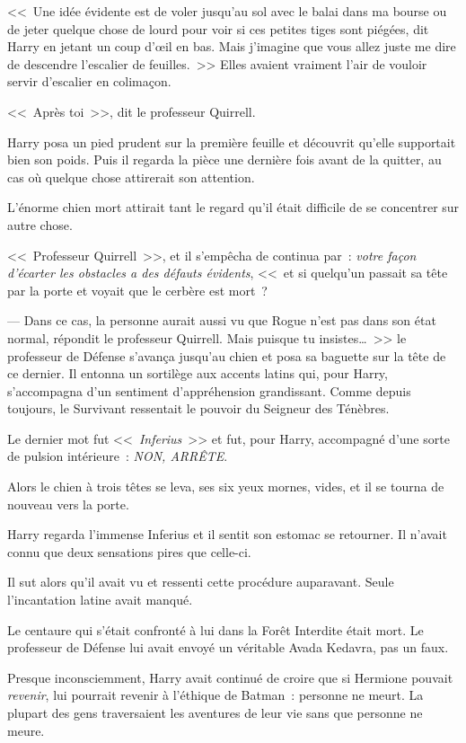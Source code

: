 <<~Une idée évidente est de voler jusqu'au sol avec le balai dans ma bourse ou de jeter quelque chose de lourd pour voir si ces petites tiges sont piégées, dit Harry en jetant un coup d'œil en bas. Mais j'imagine que vous allez juste me dire de descendre l'escalier de feuilles.~>> Elles avaient vraiment l'air de vouloir servir d'escalier en colimaçon.

<<~Après toi~>>, dit le professeur Quirrell.

Harry posa un pied prudent sur la première feuille et découvrit qu'elle supportait bien son poids. Puis il regarda la pièce une dernière fois avant de la quitter, au cas où quelque chose attirerait son attention.

L'énorme chien mort attirait tant le regard qu'il était difficile de se concentrer sur autre chose.

<<~Professeur Quirrell~>>, et il s'empêcha de continua par~: \emph{votre façon d'écarter les obstacles a des défauts évidents}, <<~et si quelqu'un passait sa tête par la porte et voyait que le cerbère est mort~?

--- Dans ce cas, la personne aurait aussi vu que Rogue n'est pas dans son état normal, répondit le professeur Quirrell. Mais puisque tu insistes…~>> le professeur de Défense s'avança jusqu'au chien et posa sa baguette sur la tête de ce dernier. Il entonna un sortilège aux accents latins qui, pour Harry, s'accompagna d'un sentiment d'appréhension grandissant. Comme depuis toujours, le Survivant ressentait le pouvoir du Seigneur des Ténèbres.

Le dernier mot fut <<~\emph{Inferius}~>> et fut, pour Harry, accompagné d'une sorte de pulsion intérieure~: \emph{NON, ARRÊTE}.

Alors le chien à trois têtes se leva, ses six yeux mornes, vides, et il se tourna de nouveau vers la porte.

Harry regarda l'immense Inferius et il sentit son estomac se retourner. Il n'avait connu que deux sensations pires que celle-ci.

Il sut alors qu'il avait vu et ressenti cette procédure auparavant. Seule l'incantation latine avait manqué.

Le centaure qui s'était confronté à lui dans la Forêt Interdite était mort. Le professeur de Défense lui avait envoyé un véritable Avada Kedavra, pas un faux.

Presque inconsciemment, Harry avait continué de croire que si Hermione pouvait \emph{revenir}, lui pourrait revenir à l'éthique de Batman~: personne ne meurt. La plupart des gens traversaient les aventures de leur vie sans que personne ne meure.

